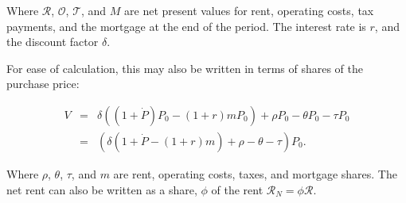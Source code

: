 
 Where $\mathcal{R}$, $\mathcal{O}$, $\mathcal{T}$, and $M$ are  net present values for rent, operating costs, tax payments, and the mortgage at the end of the period. The interest rate is $r$, and the discount factor $\delta$.

 For ease of calculation, this may also be written in terms of shares of the purchase price:

\begin{eqnarray}
V &=& \delta \left((1+\dot P) P_0 - (1+r)mP_0\right) + \rho P_0 - \theta P_0 - \tau P_0 \nonumber \\
  &=& \left(\delta \left(1+\dot P - (1+r)m   \right) + \rho     - \theta     - \tau\right) P_0.
\label{eqn-v2}
\end{eqnarray}
 
 Where $\rho$, $\theta$, $\tau$, and $m$ are rent, operating costs, taxes, and mortgage shares. The net rent can also be written as a share, $\phi$ of the rent $\mathcal{R}_N = \phi \mathcal{R}$.
 
